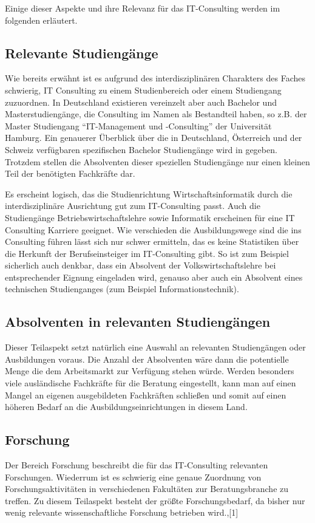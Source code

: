 Einige dieser Aspekte und ihre Relevanz für das IT-Consulting werden im folgenden erläutert.

\subsection*{Relevante Studiengänge}
Wie bereits erwähnt ist es aufgrund des interdisziplinären Charakters des Faches schwierig, IT Consulting zu einem Studienbereich oder einem Studiengang zuzuordnen. 
In Deutschland existieren vereinzelt aber auch Bachelor und Masterstudiengänge, die Consulting im Namen als Bestandteil haben, so z.B. der Master Studiengang ``IT-Management und -Consulting'' der Universität Hamburg. Ein genauerer Überblick über die in Deutschland, Österreich und der Schweiz verfügbaren spezifischen Bachelor Studiengänge wird in \cite{NissenKlaukDeelmannMohe201209} gegeben. Trotzdem stellen die Absolventen dieser speziellen Studiengänge nur einen kleinen Teil der benötigten Fachkräfte dar.

Es erscheint logisch, das die Studienrichtung Wirtschaftsinformatik durch die interdisziplinäre Ausrichtung gut zum IT-Consulting passt. Auch die Studiengänge Betriebswirtschaftslehre sowie Informatik erscheinen für eine IT Consulting Karriere geeignet. Wie verschieden die Ausbildungswege sind die ins Consulting führen lässt sich nur schwer ermitteln, das es keine Statistiken über die Herkunft der Berufseinsteiger im IT-Consulting gibt.
So ist zum Beispiel sicherlich auch denkbar, dass ein Absolvent der Volkswirtschaftslehre bei entsprechender Eignung eingeladen wird, genauso aber auch ein Absolvent eines technischen Studienganges (zum Beispiel Informationstechnik).

\subsection*{Absolventen in relevanten Studiengängen}
Dieser Teilaspekt setzt natürlich eine Auswahl an relevanten Studiengängen oder Ausbildungen voraus. Die Anzahl der Absolventen wäre dann die potentielle Menge die dem Arbeitsmarkt zur Verfügung stehen würde. Werden besonders viele ausländische Fachkräfte für die Beratung eingestellt, kann man auf einen Mangel an eigenen ausgebildeten Fachkräften schließen und somit auf einen höheren Bedarf an die Ausbildungseinrichtungen in diesem Land.

\subsection*{Forschung}
Der Bereich Forschung beschreibt die für das IT-Consulting relevanten Forschungen. Wiederrum ist es schwierig eine genaue Zuordnung von Forschungsaktivitäten in verschiedenen Fakultäten zur Beratungsbranche zu treffen. Zu diesem Teilaspekt besteht der größte Forschungsbedarf, da bisher nur wenig relevante wissenschaftliche Forschung betrieben wird.\cite[10]{nissen2007consulting},\cite{IDSScheer}[1]

